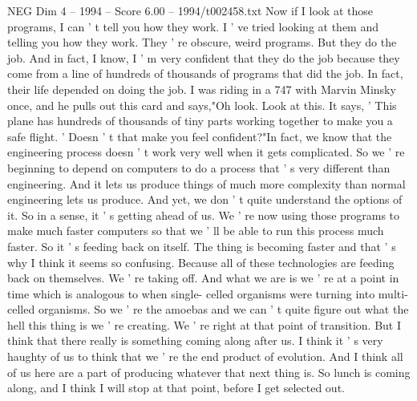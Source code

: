 \begin{textsample}{NEG Dim 4 – 1994 – Score 6.00 – 1994/t002458.txt}
Now if I look at those programs, I can ' t tell you how they work.
I ' ve tried looking at them and telling you how they work.
They ' re obscure, weird programs.
But they do the job.
And in fact, I know, I ' m very confident that they do the job because they come from a line of hundreds of thousands of programs that did the job.
In fact, their life depended on doing the job.
I was riding in a 747 with Marvin Minsky once, and he pulls out this card and says,"Oh look.
Look at this.
It says, ' This plane has hundreds of thousands of tiny parts working together to make you a safe flight. ' Doesn ' t that make you feel confident?"In fact, we know that the engineering process doesn ' t work very well when it gets complicated.
So we ' re beginning to depend on computers to do a process that ' s very different than engineering.
And it lets us produce things of much more complexity than normal engineering lets us produce.
And yet, we don ' t quite understand the options of it.
So in a sense, it ' s getting ahead of us.
We ' re now using those programs to make much faster computers so that we ' ll be able to run this process much faster.
So it ' s feeding back on itself.
The thing is becoming faster and that ' s why I think it seems so confusing.
Because all of these technologies are feeding back on themselves.
We ' re taking off.
And what we are is we ' re at a point in time which is analogous to when single- celled organisms were turning into multi-celled organisms.
So we ' re the amoebas and we can ' t quite figure out what the hell this thing is we ' re creating.
We ' re right at that point of transition.
But I think that there really is something coming along after us.
I think it ' s very haughty of us to think that we ' re the end product of evolution.
And I think all of us here are a part of producing whatever that next thing is.
So lunch is coming along, and I think I will stop at that point, before I get selected out.

\end{textsample}

